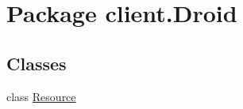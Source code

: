 \hypertarget{namespaceclient_1_1Droid}{\section{Package client.\-Droid}
\label{namespaceclient_1_1Droid}
}
\subsection*{Classes}
\begin{DoxyCompactItemize}
\item 
class \hyperlink{classclient_1_1Droid_1_1Resource}{Resource}
\end{DoxyCompactItemize}
